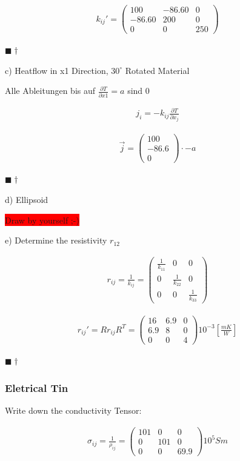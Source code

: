 \documentclass[a4paper]{scrartcl}
\newcommand{\qed}{\begin{flushright}
$\blacksquare \dagger$ \end{flushright}}
\begin{document}
\begin{align}
k_{ij}'=\begin{pmatrix}
100 & -86.60 & 0 \\
-86.60 & 200 & 0 \\
0 & 0 & 250
\end{pmatrix}
\end{align}
\qed

c) Heatflow in x1 Direction, $30^\circ$ Rotated Material

Alle Ableitungen bis auf $\frac{\partial T}{\partial x1}=a$ sind 0


\begin{align}
j_i=-k_{ij} \frac{\partial T}{\partial x_j}
\end{align}

\begin{align}
\vec{j}=\begin{pmatrix}
100 \\
-86.6 \\
0
\end{pmatrix}
\cdot -a
\end{align}

\qed
d) Ellipsoid

\colorbox{red}{Draw by yourself ;-)}

e) Determine the resistivity $r_{12}$

\begin{align}
r_{ij}=\frac{1}{k_{ij}}=\begin{pmatrix}
\frac{1}{k_{11}} & 0 & 0 \\
0 & \frac{1}{k_{22}} & 0 \\
0 & 0 & \frac{1}{k_{33}}
\end{pmatrix}
\end{align}

\begin{align}
r_{ij}'=Rr_{ij}R^{T} = \begin{pmatrix}
16 & 6.9 & 0 \\
6.9 & 8 & 0 \\
0 & 0 & 4
\end{pmatrix}
10^{-3}[\frac{mK}{W}] 
\end{align}
\qed




\subsubsection{Eletrical Tin}
Write down the conductivity Tensor:

\begin{align}
\sigma_{ij} = \frac{1}{\rho_{ij}}= \begin{pmatrix}
101 & 0 & 0 \\
0 & 101 & 0 \\
0 & 0 & 69.9 
\end{pmatrix}
10^5 Sm
\end{align}
\end{document}
